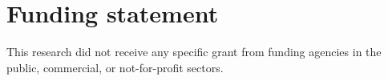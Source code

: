 \section*{Funding statement}
\noindent This research did not receive any specific grant from funding agencies in the public, commercial, or not-for-profit sectors.
